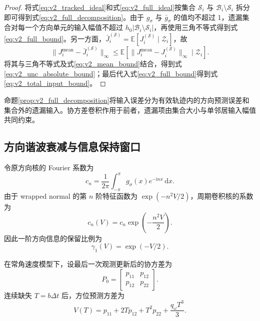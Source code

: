 \documentclass[UTF8,fontset=windows,11pt]{ctexart}
\newcommand{\E}{\mathbb E}
\begin{document}
\begin{proof}
将式\eqref{eq:v2_tracked_ideal}和式\eqref{eq:v2_full_ideal}按集合 $\mathcal S_i$ 与 $\mathcal B_i\setminus\mathcal S_i$ 拆分即可得到式\eqref{eq:v2_full_decomposition}。由于 $g_\sigma$ 与 $\bar g_\sigma$ 的值均不超过 1，遗漏集合对每一个方向单元的输入幅值不超过 $h_0|\mathcal B_i\setminus\mathcal S_i|$，再使用三角不等式得到式\eqref{eq:v2_full_bound}。另一方面，$\bar J_i^{(\mathcal S)}=\E[J_i^{(\mathcal S)}\mid\mathcal Z_i]$，故
\[
 \|J_i^{\mathrm{mean}}-\bar J_i^{(\mathcal S)}\|_\infty
 \le\E[\|J_i^{\mathrm{mean}}-J_i^{(\mathcal S)}\|_\infty\mid\mathcal Z_i].
\]
将其与三角不等式及式\eqref{eq:v2_mean_bound}结合，得到式\eqref{eq:v2_unc_absolute_bound}；最后代入式\eqref{eq:v2_full_bound}得到式\eqref{eq:v2_total_input_bound}。
\end{proof}

命题\ref{prop:v2_full_decomposition}将输入误差分为有效轨迹内的方向预测误差和集合外的遗漏输入。协方差卷积作用于前者，遗漏项由集合大小与单邻居输入幅值共同约束。



\subsection{方向谐波衰减与信息保持窗口}

令原方向核的 Fourier 系数为
\begin{equation}
 c_n=\frac{1}{2\pi}\int_{-\pi}^{\pi}g_\sigma(x)e^{-\mathrm inx}\,\mathrm dx .
 \label{eq:v2_fourier_coeff}
\end{equation}
由于 wrapped normal 的第 $n$ 阶特征函数为 $\exp(-n^2V/2)$，周期卷积核的系数为
\begin{equation}
 c_n(V)=c_n\exp\left(-\frac{n^2V}{2}\right).
 \label{eq:v2_harmonic_decay}
\end{equation}
因此一阶方向信息的保留比例为
\begin{equation}
 \gamma_1(V)=\exp(-V/2).
 \label{eq:v2_first_harmonic}
\end{equation}

在常角速度模型下，设最后一次观测更新后的协方差为
\begin{equation}
 P_0=\begin{bmatrix}p_{11}&p_{12}\\p_{12}&p_{22}\end{bmatrix}.
 \label{eq:v2_p0}
\end{equation}
连续缺失 $T=b\Delta t$ 后，方位预测方差为
\begin{equation}
 V(T)=p_{11}+2Tp_{12}+T^2p_{22}+\frac{q_\omega T^3}{3}.
 \label{eq:v2_vt}
\end{equation}
\end{document}
